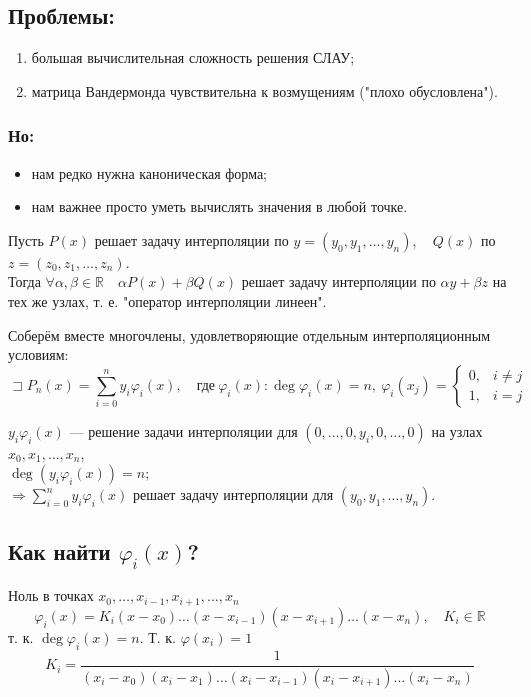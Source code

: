 \subsection*{Проблемы:}
\begin{enumerate}
    \item большая вычислительная сложность решения СЛАУ;
    \item матрица Вандермонда чувствительна к возмущениям ("плохо обусловлена").
\end{enumerate}

\subsubsection*{Но:}
\begin{itemize}
    \item нам редко нужна каноническая форма;
    \item нам важнее просто уметь вычислять значения в любой точке.
\end{itemize}

Пусть $P(x)$ решает задачу интерполяции по $y = (y_0, y_1, \ldots, y_n)$, ~ $Q(x)$ по $z = (z_0, z_1, \ldots, z_n)$. \\
Тогда $\forall \alpha, \beta \in \mathbb{R} \quad \alpha P(x) + \beta Q(x)$ решает задачу интерполяции по $\alpha y + \beta z$ на тех же узлах, т. е. "оператор интерполяции линеен".

Соберём вместе многочлены, удовлетворяющие отдельным интерполяционным условиям:
\[
\sqsupset P_n(x) = \sum_{i=0}^n y_i \varphi_i(x), \quad
\text{где} ~ \varphi_i(x): \deg \varphi_i(x) = n, ~ \varphi_i(x_j) =
\begin{cases}
0, & i \neq j \\
1, & i = j
\end{cases}
\]

$y_i \varphi_i(x)$ --- решение задачи интерполяции для $(0, \ldots, 0, y_i, 0, \ldots, 0)$ на узлах $x_0, x_1, \ldots, x_n$, \\
$\deg (y_i \varphi_i(x)) = n$; \\
$\Rightarrow \sum_{i=0}^n y_i \varphi_i(x)$ решает задачу интерполяции для $(y_0, y_1, \ldots, y_n)$.

\subsection*{Как найти $\varphi_i(x)$?}

Ноль в точках $x_0, \ldots, x_{i-1}, x_{i+1}, \ldots, x_n$
\[
\varphi_i(x) = K_i (x - x_0) \ldots (x - x_{i-1})(x - x_{i+1}) \ldots (x - x_n), \quad K_i \in \mathbb{R}
\]
т. к. $\deg \varphi_i(x) = n$. Т. к. $\varphi(x_i) = 1$
\[
K_i =  \frac{1}{(x_i - x_0)(x_i - x_1) \ldots (x_i - x_{i-1})(x_i - x_{i+1}) \ldots (x_i - x_n)}
\]

